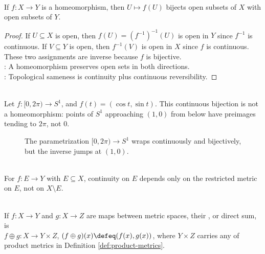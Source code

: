 \begin{proposition} \label{prop:homeomorphisms-preserve-topology} \\
If $f:X\to Y$ is a homeomorphism, then $U\mapsto f(U)$ bijects open subsets of $X$ with open subsets of $Y$.
\begin{proof}
If $U\subseteq X$ is open, then $f(U)=(f^{-1})^{-1}(U)$ is open in $Y$ since $f^{-1}$ is continuous. If $V\subseteq Y$ is open, then $f^{-1}(V)$ is open in $X$ since $f$ is continuous. These two assignments are inverse because $f$ is bijective.\\
: A homeomorphism preserves open sets in both directions.\\
: Topological sameness is continuity plus continuous reversibility.
\end{proof}
\end{proposition}

\begin{example} \label{ex:circle-param-continuous-bijection-not-homeomorphism} \\
Let $f:[0,2\pi)\to S^1$, and $f(t)=(\cos t,\sin t)$. This continuous bijection is not a homeomorphism: points of $S^1$ approaching $(1,0)$ from below have preimages tending to $2\pi$, not $0$.
\end{example}

\begin{figure}[htbp]
  \centering
  
  \caption{The parametrization $[0,2\pi)\to S^1$ wraps continuously and bijectively, but the inverse jumps at $(1,0)$.}
  \label{fig:circle-interval-wrap-not-homeomorphism}
\end{figure}

\begin{remark} \label{rem:continuity-domain-only} \\
For $f:E\to Y$ with $E\subseteq X$, continuity on $E$ depends only on the restricted metric on $E$, not on $X\setminus E$.
\end{remark}

\begin{definition} \label{def:product-map-direct-sum} \\
If $f:X\to Y$ and $g:X\to Z$ are maps between metric spaces, their , or direct sum, is\\
$f\oplus g:X\to Y\times Z$, $(f\oplus g)(x)\defeq(f(x),g(x))$, where $Y\times Z$ carries any of product metrics in Definition \ref{def:product-metrics}.
\end{definition}

